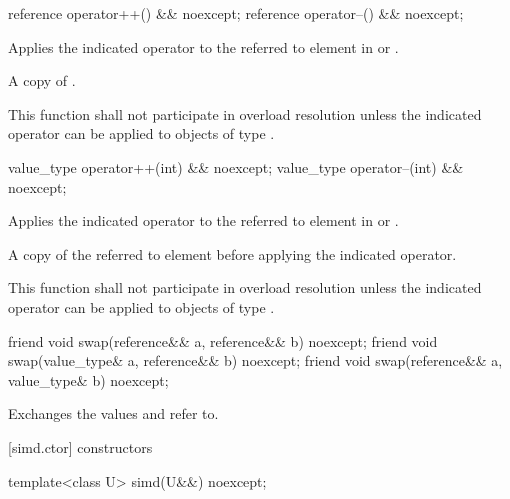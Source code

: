 \begin{itemdecl}
reference operator++() && noexcept;
reference operator--() && noexcept;
\end{itemdecl}

\begin{itemdescr}
  \pnum\effects
  Applies the indicated operator to the referred to element in  or .

  \pnum\returns
  A copy of .

  \pnum\remarks
  This function shall not participate in overload resolution unless the indicated operator can be applied to objects of type .
\end{itemdescr}

\begin{itemdecl}
value_type operator++(int) && noexcept;
value_type operator--(int) && noexcept;
\end{itemdecl}

\begin{itemdescr}
  \pnum\effects
  Applies the indicated operator to the referred to element in  or .

  \pnum\returns
  A copy of the referred to element before applying the indicated operator.

  \pnum\remarks
  This function shall not participate in overload resolution unless the indicated operator can be applied to objects of type .
\end{itemdescr}

\begin{itemdecl}
friend void swap(reference&& a, reference&& b) noexcept;
friend void swap(value_type& a, reference&& b) noexcept;
friend void swap(reference&& a, value_type& b) noexcept;
\end{itemdecl}

\begin{itemdescr}
  \pnum\effects
  Exchanges the values  and  refer to.
\end{itemdescr}

[simd.ctor]{ constructors}

\begin{itemdecl}
template<class U> simd(U&&) noexcept;
\end{itemdecl}

